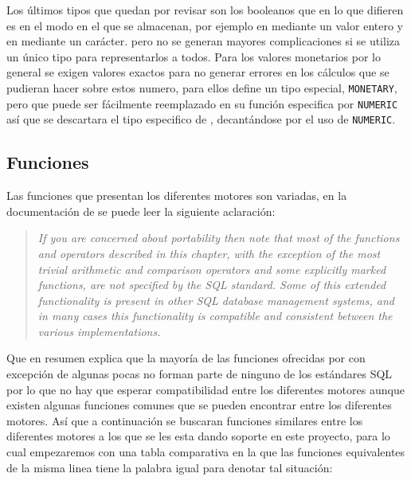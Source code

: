 Los últimos tipos que quedan por revisar son los booleanos que en lo que difieren es en el modo en el que se almacenan, por ejemplo en \m mediante un valor entero y en \p mediante un carácter. pero no se generan mayores complicaciones si se utiliza un único tipo para representarlos a todos. Para los valores monetarios por lo general se exigen valores exactos para no generar errores en los cálculos que se pudieran hacer sobre estos numero, para ellos \p define un tipo especial, \verb=MONETARY=, pero que puede ser fácilmente reemplazado en su función especifica por \verb=NUMERIC= así que se descartara el tipo especifico de \p, decantándose por el uso de \verb=NUMERIC=.  
\subsection{Funciones}
\label{especificacion:funciones} 
Las funciones que presentan los diferentes motores son variadas, en la documentación de  \p se puede leer\citep{postgre:functions} la siguiente aclaración:
%
\begin{quotation}
\textit{If you are concerned about portability then note that most of the functions and operators described in this chapter, with the exception of the most trivial arithmetic and comparison operators and some explicitly marked functions, are not specified by the SQL standard. Some of this extended functionality is present in other SQL database management systems, and in many cases this functionality is compatible and consistent between the various implementations.}
\end{quotation}
%
Que en resumen explica que la mayoría de las funciones ofrecidas por \p con excepción de algunas pocas no forman parte de ninguno de los estándares SQL por lo que no hay que esperar compatibilidad entre los diferentes motores aunque existen algunas funciones comunes que se pueden encontrar entre los diferentes motores. Así que a continuación se buscaran funciones similares entre los diferentes motores a los que se les esta dando soporte en este proyecto, para lo cual empezaremos con una tabla comparativa en la que las funciones equivalentes de la misma linea tiene la palabra igual para denotar tal situación:

